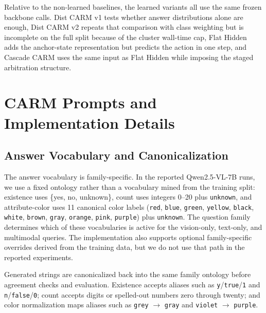 \documentclass[11pt]{article}
\begin{document}




Relative to the non-learned baselines, the learned variants all use the same frozen
backbone calls. Dist CARM v1 tests whether answer distributions alone are enough, Dist
CARM v2 repeats that comparison with class weighting but is incomplete on the full split
because of the cluster wall-time cap, Flat Hidden adds the anchor-state representation but
predicts the action in one step, and Cascade CARM uses the same input as Flat Hidden while
imposing the staged arbitration structure.


\section{CARM Prompts and Implementation Details}
\label{app:method-details}

\subsection{Answer Vocabulary and Canonicalization}
\label{app:vocab-details}

The answer vocabulary is family-specific. In the reported Qwen2.5-VL-7B runs,
we use a fixed ontology rather than a vocabulary mined from the training split:
existence uses \{yes, no, unknown\}, count uses integers 0--20 plus
\texttt{unknown}, and attribute-color uses 11 canonical color labels
(\texttt{red}, \texttt{blue}, \texttt{green}, \texttt{yellow},
\texttt{black}, \texttt{white}, \texttt{brown}, \texttt{gray},
\texttt{orange}, \texttt{pink}, \texttt{purple}) plus \texttt{unknown}. The
question family determines which of these vocabularies is active for the
vision-only, text-only, and multimodal queries. The implementation also
supports optional family-specific overrides derived from the training data, but
we do not use that path in the reported experiments.

Generated strings are canonicalized back into the same family ontology before
agreement checks and evaluation. Existence accepts aliases such as
\texttt{y}/\texttt{true}/\texttt{1} and \texttt{n}/\texttt{false}/\texttt{0};
count accepts digits or spelled-out numbers zero through twenty; and color
normalization maps aliases such as \texttt{grey} $\rightarrow$ \texttt{gray}
and \texttt{violet} $\rightarrow$ \texttt{purple}.
\end{document}
